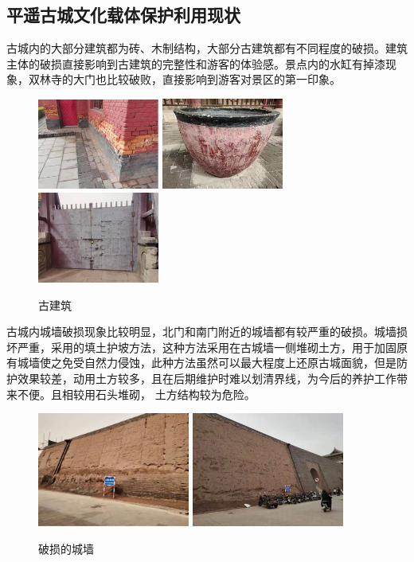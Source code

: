 \documentclass[UTF8]{ctexart}
\begin{document}
    \subsection{平遥古城文化载体保护利用现状}
    古城内的大部分建筑都为砖、木制结构，大部分古建筑都有不同程度的破损。建筑主体的破损直接影响到古建筑的完整性和游客的体验感。景点内的水缸有掉漆现象，双林寺的大门也比较破败，直接影响到游客对景区的第一印象。
    \begin{figure}[H]
    \centering
    \includegraphics[width=4cm]{图片 19.png}
    \includegraphics[width=4cm]{图片 20.png}
    \includegraphics[width=4cm]{图片 21.png}
    \caption{古建筑}
    \end{figure}
    古城内城墙破损现象比较明显，北门和南门附近的城墙都有较严重的破损。城墙损坏严重，采用的填土护坡方法，这种方法采用在古城墙一侧堆砌土方，用于加固原有城墙使之免受自然力侵蚀，此种方法虽然可以最大程度上还原古城面貌，但是防护效果较差，动用土方较多，且在后期维护时难以划清界线，为今后的养护工作带来不便。且相较用石头堆砌， 土方结构较为危险。
    \begin{figure}[H]
    \centering
    \includegraphics[width=5cm]{图片 23.png}
    \includegraphics[width=5cm]{图片 24.png}
    \caption{破损的城墙}
    \end{figure}
\end{document}
